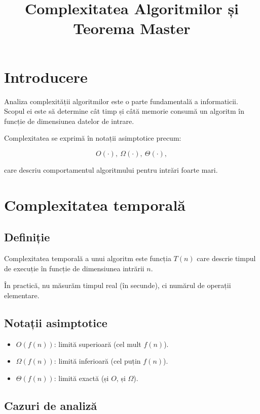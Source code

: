 \documentclass[12pt]{article}
\title{Complexitatea Algoritmilor și Teorema Master}
\author{}
\date{}
\begin{document}
\maketitle

\section{Introducere}

Analiza complexității algoritmilor este o parte fundamentală a informaticii.
Scopul ei este să determine cât timp și câtă memorie consumă un algoritm în
funcție de dimensiunea datelor de intrare.

Complexitatea se exprimă în notații asimptotice precum:


\[
O(\cdot),\ \Omega(\cdot),\ \Theta(\cdot),
\]


care descriu comportamentul algoritmului pentru intrări foarte mari.

\section{Complexitatea temporală}

\subsection{Definiție}

Complexitatea temporală a unui algoritm este funcția $T(n)$ care descrie timpul
de execuție în funcție de dimensiunea intrării $n$.

În practică, nu măsurăm timpul real (în secunde), ci numărul de operații
elementare.

\subsection{Notații asimptotice}

\begin{itemize}
    \item $O(f(n))$: limită superioară (cel mult $f(n)$).
    \item $\Omega(f(n))$: limită inferioară (cel puțin $f(n)$).
    \item $\Theta(f(n))$: limită exactă (și $O$, și $\Omega$).
\end{itemize}

\subsection{Cazuri de analiză}
\end{document}

